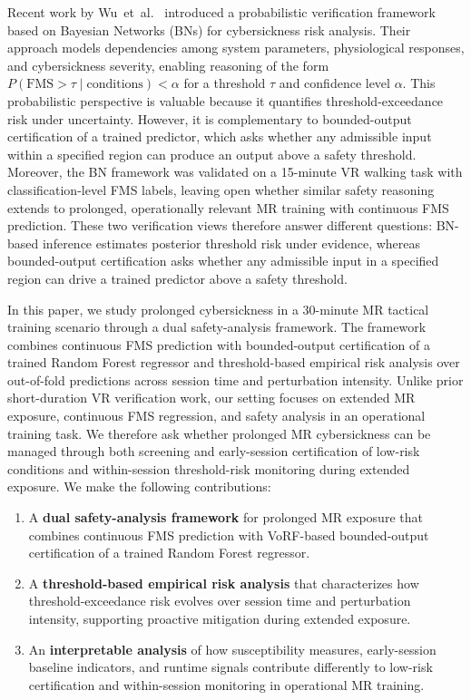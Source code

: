 \documentclass[review]{vgtc}              %
\begin{document}
Recent work by Wu~et~al.~\cite{Wu2025BN} introduced a probabilistic verification framework based on Bayesian Networks (BNs) for cybersickness risk analysis. Their approach models dependencies among system parameters, physiological responses, and cybersickness severity, enabling reasoning of the form $P(\mathrm{FMS} > \tau \mid \mathrm{conditions}) < \alpha$ for a threshold $\tau$ and confidence level $\alpha$. This probabilistic perspective is valuable because it quantifies threshold-exceedance risk under uncertainty. However, it is complementary to bounded-output certification of a trained predictor, which asks whether any admissible input within a specified region can produce an output above a safety threshold. Moreover, the BN framework was validated on a 15-minute VR walking task with classification-level FMS labels, leaving open whether similar safety reasoning extends to prolonged, operationally relevant MR training with continuous FMS prediction. These two verification views therefore answer different questions: BN-based inference estimates posterior threshold risk under evidence, whereas bounded-output certification asks whether any admissible input in a specified region can drive a trained predictor above a safety threshold.

In this paper, we study prolonged cybersickness in a 30-minute MR tactical training scenario through a dual safety-analysis framework. The framework combines continuous FMS prediction with bounded-output certification of a trained Random Forest regressor and threshold-based empirical risk analysis over out-of-fold predictions across session time and perturbation intensity. Unlike prior short-duration VR verification work, our setting focuses on extended MR exposure, continuous FMS regression, and safety analysis in an operational training task. We therefore ask whether prolonged MR cybersickness can be managed through both screening and early-session certification of low-risk conditions and within-session threshold-risk monitoring during extended exposure. We make the following contributions:
\begin{enumerate}[leftmargin=*, nosep]
  \item A \textbf{dual safety-analysis framework} for prolonged MR exposure that combines continuous FMS prediction with VoRF-based bounded-output certification of a trained Random Forest regressor.
  \item A \textbf{threshold-based empirical risk analysis} that characterizes how threshold-exceedance risk evolves over session time and perturbation intensity, supporting proactive mitigation during extended exposure.
  \item An \textbf{interpretable analysis} of how susceptibility measures, early-session baseline indicators, and runtime signals contribute differently to low-risk certification and within-session monitoring in operational MR training.
\end{enumerate}
\end{document}
